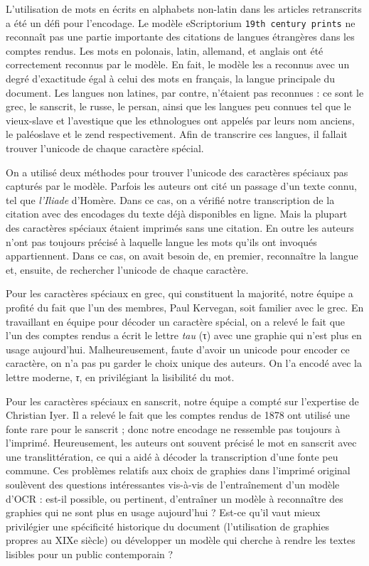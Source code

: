 \documentclass{article}
\begin{document}
	L'utilisation de mots en écrits en alphabets non-latin dans les articles retranscrits a été un défi pour l’encodage. Le modèle eScriptorium \texttt{19th century prints} ne reconnaît pas une partie importante des citations de langues étrangères dans les comptes rendus. Les mots en polonais, latin, allemand, et anglais ont été correctement reconnus par le modèle. En fait, le modèle les a reconnus avec un degré d’exactitude égal à celui des mots en français, la langue principale du document. Les langues non latines, par contre, n’étaient pas reconnues : ce sont le grec, le sanscrit, le russe, le persan, ainsi que les langues peu connues tel que le vieux-slave et l’avestique que les ethnologues ont appelés par leurs nom anciens, le paléoslave et le zend respectivement. Afin de transcrire ces langues, il fallait trouver l’unicode de chaque caractère spécial.
	
	On a utilisé deux méthodes pour trouver l’unicode des caractères spéciaux pas capturés par le modèle. Parfois les auteurs ont cité un passage d’un texte connu, tel que \textit{l’Iliade} d'Homère. Dans ce cas, on a vérifié notre transcription de la citation avec des encodages du texte déjà disponibles en ligne. Mais la plupart des caractères spéciaux étaient imprimés sans une citation. En outre les auteurs n’ont pas toujours précisé à laquelle langue les mots qu’ils ont invoqués appartiennent. Dans ce cas, on avait besoin de, en premier, reconnaître la langue et, ensuite, de rechercher l’unicode de chaque caractère.
	
	Pour les caractères spéciaux en grec, qui constituent la majorité, notre équipe a profité du fait que l'un des membres, Paul Kervegan, soit familier avec le grec. En travaillant en équipe pour décoder un caractère spécial, on a relevé le fait que l’un des comptes rendus a écrit le lettre \textit{tau} {\ellinika (τ)} avec une graphie qui n'est plus en usage aujourd'hui. Malheureusement, faute d'avoir un unicode pour encoder ce caractère, on n’a pas pu garder le choix unique des auteurs. On l’a encodé avec la lettre moderne, \textit{\ellinika τ}, en privilégiant la lisibilité du mot.
	
	Pour les caractères spéciaux en sanscrit, notre équipe a compté sur l’expertise de Christian Iyer. Il a relevé le fait que les comptes rendus de 1878 ont utilisé une fonte rare pour le sanscrit ; donc notre encodage ne ressemble pas toujours à l’imprimé. Heureusement, les auteurs ont souvent précisé le mot en sanscrit avec une translittération, ce qui a aidé à décoder la transcription d’une fonte peu commune. Ces problèmes relatifs aux choix de graphies dans l'imprimé original soulèvent des questions intéressantes vis-à-vis de l'entraînement d'un modèle d'OCR : est-il possible, ou pertinent, d'entraîner un modèle à reconnaître des graphies qui ne sont plus en usage aujourd'hui ? Est-ce qu'il vaut mieux privilégier une spécificité historique du document (l'utilisation de graphies propres au XIXe siècle) ou développer un modèle qui cherche à rendre les textes lisibles pour un public contemporain ?
	
\end{document}
